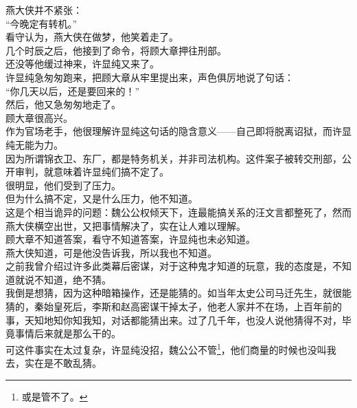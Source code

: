 \begin{multicols}{\theparacolNo}
燕大侠并不紧张：\\

“今晚定有转机。”\\

看守认为，燕大侠在做梦，他笑着走了。\\

几个时辰之后，他接到了命令，将顾大章押往刑部。\\

还没等他缓过神来，许显纯又来了。\\

许显纯急匆匆跑来，把顾大章从牢里提出来，声色俱厉地说了句话：\\

“你几天以后，还是要回来的！”\\

然后，他又急匆匆地走了。\\

顾大章很高兴。\\

作为官场老手，他很理解许显纯这句话的隐含意义——自己即将脱离诏狱，而许显纯无能为力。\\

因为所谓锦衣卫、东厂，都是特务机关，并非司法机构。这件案子被转交刑部，公开审判，就意味着许显纯们搞不定了。\\

很明显，他们受到了压力。\\

但为什么搞不定，又是什么压力，他不知道。\\

这是个相当诡异的问题：魏公公权倾天下，连最能搞关系的汪文言都整死了，然而燕大侠横空出世，又把事情解决了，实在让人难以理解。\\

顾大章不知道答案，看守不知道答案，许显纯也未必知道。\\

燕大侠知道，可是他没告诉我，所以我也不知道。\\

之前我曾介绍过许多此类幕后密谋，对于这种鬼才知道的玩意，我的态度是，不知道就说不知道，绝不猜。\\

我倒是想猜，因为这种暗箱操作，还是能猜的。如当年太史公司马迁先生，就很能猜的，秦始皇死后，李斯和赵高密谋干掉太子，他老人家并不在场，上百年前的事，天知地知你知我知，对话都能猜出来。过了几千年，也没人说他猜得不对，毕竟事情后来就是那么干的。\\

可这件事实在太过复杂，许显纯没招，魏公公不管\footnote{或是管不了。}，他们商量的时候也没叫我去，实在是不敢乱猜。\\


\end{multicols}
